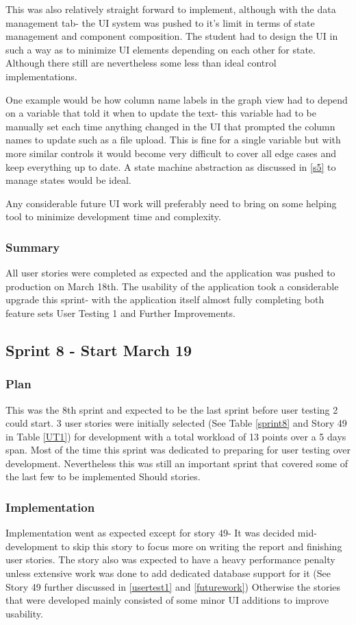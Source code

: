 This was also relatively straight forward to implement, although with the data management tab- the UI system was pushed to it's limit in terms of state management and component composition. The student had to design the UI in such a way as to minimize UI elements depending on each other for state. Although there still are nevertheless some less than ideal control implementations.

One example would be how column name labels in the graph view had to depend on a variable that told it when to update the text- this variable had to be manually set each time anything changed in the UI that prompted the column names to update such as a file upload. This is fine for a single variable but with more similar controls it would become very difficult to cover all edge cases and keep everything up to date. A state machine abstraction as discussed in \ref{s5} to manage states would be ideal.

Any considerable future UI work will preferably need to bring on some helping tool to minimize development time and complexity.

\subsubsection{Summary}
All user stories were completed as expected and the application was pushed to production on March 18th. The usability of the application took a considerable upgrade this sprint- with the application itself almost fully completing both feature sets User Testing 1 and Further Improvements.

\subsection{Sprint 8 - Start March 19}
\subsubsection{Plan}
This was the 8th sprint and expected to be the last sprint before user testing 2 could start. 3 user stories were initially selected (See Table \ref{sprint8} and Story 49 in Table \ref{UT1}) for development with a total workload of 13 points over a 5 days span. Most of the time this sprint was dedicated to preparing for user testing over development. Nevertheless this was still an important sprint that covered some of the last few to be implemented Should stories.

\subsubsection{Implementation}
Implementation went as expected except for story 49- It was decided mid-development to skip this story to focus more on writing the report and finishing user stories. The story also was expected to have a heavy performance penalty unless extensive work was done to add dedicated database support for it (See Story 49 further discussed in \ref{usertest1} and \ref{futurework})
Otherwise the stories that were developed mainly consisted of some minor UI additions to improve usability.

